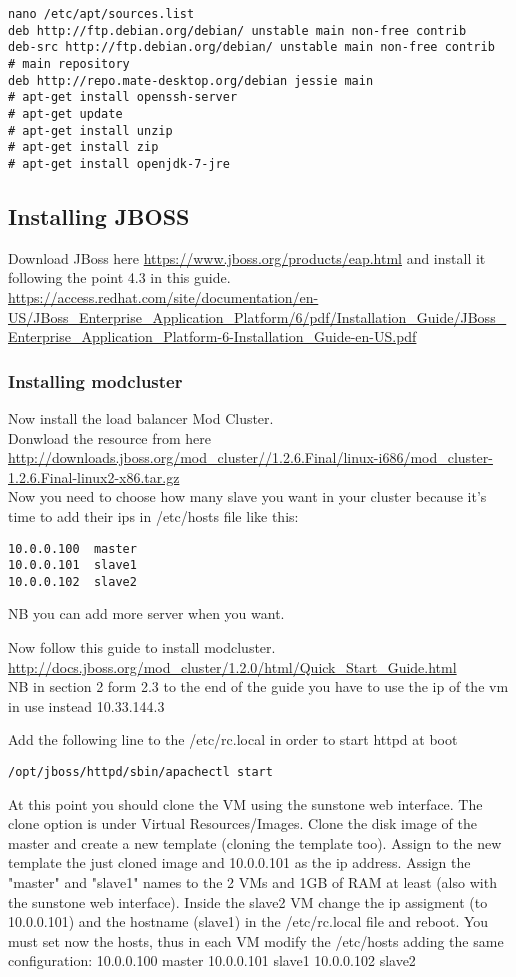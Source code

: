 \documentclass[11pt,a4paper]{article}
\begin{document}
\begin{lstlisting}
nano /etc/apt/sources.list
deb http://ftp.debian.org/debian/ unstable main non-free contrib
deb-src http://ftp.debian.org/debian/ unstable main non-free contrib
# main repository
deb http://repo.mate-desktop.org/debian jessie main
# apt-get install openssh-server
# apt-get update
# apt-get install unzip
# apt-get install zip
# apt-get install openjdk-7-jre
\end{lstlisting}

\subsection{Installing JBOSS}
Download JBoss here \url{https://www.jboss.org/products/eap.html} and install it following the point 4.3 in this guide.\cite{JBossGuide}
\url{https://access.redhat.com/site/documentation/en-US/JBoss_Enterprise_Application_Platform/6/pdf/Installation_Guide/JBoss_Enterprise_Application_Platform-6-Installation_Guide-en-US.pdf}

\subsubsection{Installing modcluster}
Now install the load balancer Mod Cluster.\\
Donwload the resource from here \url{http://downloads.jboss.org/mod_cluster//1.2.6.Final/linux-i686/mod_cluster-1.2.6.Final-linux2-x86.tar.gz}\\

Now you need to choose how many slave you want in your cluster because it's time to add their ips in /etc/hosts file like this:
\begin{lstlisting}
10.0.0.100	master
10.0.0.101	slave1
10.0.0.102	slave2
\end{lstlisting}
NB you can add more server when you want.

Now follow this guide to install modcluster.\cite{ModClusterGuide} \url{http://docs.jboss.org/mod_cluster/1.2.0/html/Quick_Start_Guide.html}\\
NB in section 2 form 2.3 to the end of the guide you have to use the ip of the vm in use instead 10.33.144.3

Add the following line to the /etc/rc.local in order to start httpd at boot
\begin{lstlisting}
/opt/jboss/httpd/sbin/apachectl start
\end{lstlisting}

At this point you should clone the VM using the sunstone web interface. The clone option is under Virtual Resources/Images. Clone the disk image of the master and create a new template (cloning the template too). Assign to the new template the just cloned image and 10.0.0.101 as the ip address.
Assign the "master" and "slave1" names to the 2 VMs and 1GB of RAM at least (also with the sunstone web interface).
Inside the slave2 VM change the ip assigment (to 10.0.0.101) and the hostname (slave1) in the /etc/rc.local file and reboot.
You must set now the hosts, thus in each VM modify the /etc/hosts adding the same configuration:
10.0.0.100    master
10.0.0.101    slave1
10.0.0.102	  slave2
\end{document}
